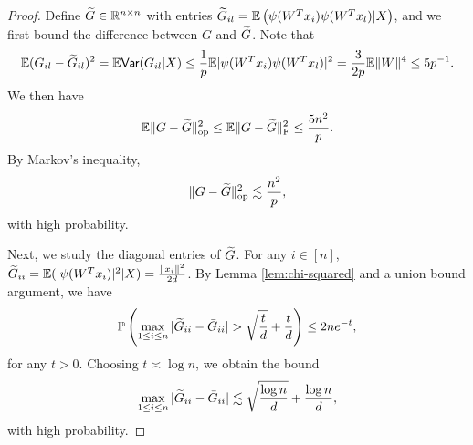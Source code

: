 \begin{proof}
Define $\widetilde{G}\in\mathbb{R}^{n\times n}$ with entries $\widetilde{G}_{il}=\mathbb{E}\left(\psi(W^Tx_i)\psi(W^Tx_l)|X\right)$, and we first bound the difference between $G$ and $\widetilde{G}$. Note that
$$\mathbb{E}(G_{il}-\widetilde{G}_{il})^2 = \mathbb{E}\textsf{Var}(G_{il}|X) \leq \frac{1}{p}\mathbb{E}|\psi(W^Tx_i)\psi(W^Tx_l)|^2=\frac{3}{2p}\mathbb{E}\|W\|^4\leq 5p^{-1}.$$
We then have
$$
\mathbb{E}\|G-\widetilde{G}\|_{\rm op}^2 \leq \mathbb{E}\|G-\widetilde{G}\|_{\rm F}^2 \leq \frac{5n^2}{p}.
$$
By Markov's inequality,
\begin{equation}
\opnorm{G-\wt{G}}^2 \lesssim \frac{n^2}{p}, \label{eq:G-G-tilde-relu}
\end{equation}
with high probability.

Next, we study the diagonal entries of $\widetilde{G}$. For any $i\in[n]$, $\widetilde{G}_{ii}=\mathbb{E}(|\psi(W^Tx_i)|^2|X)=\frac{\|x_i\|^2}{2d}$. By Lemma \ref{lem:chi-squared} and a union bound argument, we have
$$\mathbb{P}\left(\max_{1\leq i\leq n}|\wt{G}_{ii}-\bar{G}_{ii}|>\sqrt{\frac{t}{d}}+\frac{t}{d}\right)\leq 2ne^{-t},$$
for any $t>0$. Choosing $t\asymp\log n$, we obtain the bound
\begin{equation}
\max_{1\leq i\leq n}|\wt{G}_{ii}-\bar{G}_{ii}|\lesssim \sqrt{\frac{\log n}{d}}+\frac{\log n}{d}, \label{eq:G-diag-relu}
\end{equation}
with high probability.


\end{proof}
